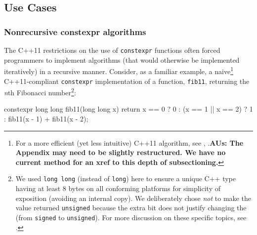 \subsection[Use Cases]{Use Cases}\label{use-cases-relaxedconstexpr}

\subsubsection[Nonrecursive \lstinline!constexpr! algorithms]{Nonrecursive {\SubsubsecCode constexpr} algorithms}\label{non-recursive-constexpr-algorithms}

The C++11 restrictions on the use of \lstinline!constexpr! functions often
forced programmers to implement algorithms (that would otherwise be
implemented iteratively) in a recursive manner. Consider, as a familiar
example, a naive{\cprotect\footnote{For a more efficient (yet less
intuitive) C++11 algorithm, see , .\textbf{AUs: The Appendix may need to be slightly restructured. We have no current method for an xref to this depth of subsectioning. }}}
C++11-compliant \lstinline!constexpr! implementation of a function,
\lstinline!fib11!, returning the \emph{n}th Fibonacci number\footnote{We used \lstinline!long!~\lstinline!long! (instead of \lstinline!long!)
here to ensure a unique C++ type having at least 8 bytes on all
conforming platforms for simplicity of exposition (avoiding an internal
copy). We deliberately chose \emph{not} to make the value returned
\lstinline!unsigned! because the extra bit does not justify changing the
 (from \lstinline!signed! to \lstinline!unsigned!). For more
discussion on these specific topics, see .}:

\begin{emcppslisting}
constexpr long long fib11(long long x)
{
    return
        x == 0 ? 0
               : (x == 1 || x == 2) ? 1
                                    : fib11(x - 1) + fib11(x - 2);
}
\end{emcppslisting}


